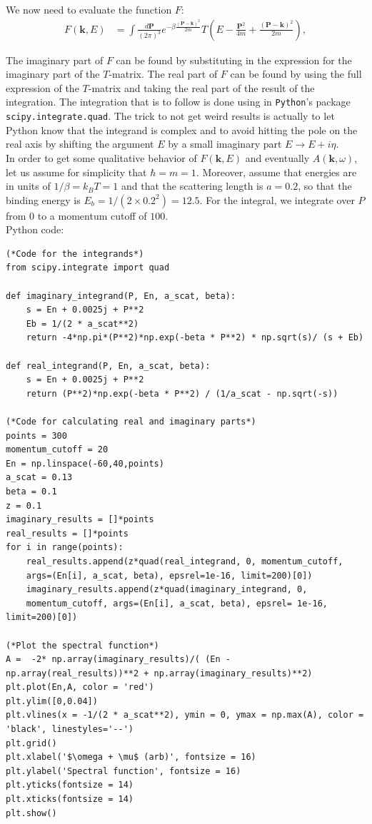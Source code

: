 \documentclass{article}
\theoremstyle{definition}
\begin{document}
\noindent We now need to evaluate the function $F$:
\begin{align}
F(\mathbf{k}, E) 
&= \int \frac{d\mathbf{P}}{(2\pi)^3} e^{-\beta \frac{(\mathbf{P} - \mathbf{k})^2}{2m}} 
T\left( E - \frac{\mathbf{P}^2}{4m} + \frac{(\mathbf{P} - \mathbf{k})^2}{2m} \right),
\end{align}

\noindent The imaginary part of $F$ can be found by substituting in the expression for the imaginary part of the $T$-matrix. The real part of $F$ can be found by using the full expression of the $T$-matrix and taking the real part of the result of the integration. The integration that is to follow is done using in \texttt{Python}'s package \texttt{scipy.integrate.quad}. The trick to not get weird results is actually to let Python know that the integrand is complex and to avoid hitting the pole on the real axis by shifting the argument $E$ by a small imaginary part $E \to E + i\eta$. \\

\noindent In order to get some qualitative behavior of $F(\mathbf{k}, E)$ and eventually $A(\mathbf{k}, \omega)$, let us assume for simplicity that $\hbar = m = 1$. Moreover, assume that energies are in units of $1/\beta = k_B T = 1$ and that the scattering length is $a = 0.2$, so that the binding energy is $E_b = 1/(2 \times 0.2^2) = 12.5$. For the integral, we integrate over $P$ from 0 to a momentum cutoff of $100$.  \\

\noindent Python code: 
\begin{lstlisting}
(*Code for the integrands*)
from scipy.integrate import quad

def imaginary_integrand(P, En, a_scat, beta):
    s = En + 0.0025j + P**2
    Eb = 1/(2 * a_scat**2)
    return -4*np.pi*(P**2)*np.exp(-beta * P**2) * np.sqrt(s)/ (s + Eb)

def real_integrand(P, En, a_scat, beta):
    s = En + 0.0025j + P**2
    return (P**2)*np.exp(-beta * P**2) / (1/a_scat - np.sqrt(-s))
        
(*Code for calculating real and imaginary parts*)
points = 300
momentum_cutoff = 20
En = np.linspace(-60,40,points)
a_scat = 0.13
beta = 0.1
z = 0.1
imaginary_results = []*points
real_results = []*points
for i in range(points):
    real_results.append(z*quad(real_integrand, 0, momentum_cutoff, 
    args=(En[i], a_scat, beta), epsrel=1e-16, limit=200)[0])
    imaginary_results.append(z*quad(imaginary_integrand, 0, 
    momentum_cutoff, args=(En[i], a_scat, beta), epsrel= 1e-16, limit=200)[0])
        
(*Plot the spectral function*)
A =  -2* np.array(imaginary_results)/( (En - np.array(real_results))**2 + np.array(imaginary_results)**2)
plt.plot(En,A, color = 'red')
plt.ylim([0,0.04])
plt.vlines(x = -1/(2 * a_scat**2), ymin = 0, ymax = np.max(A), color = 'black', linestyles='--')
plt.grid()
plt.xlabel('$\omega + \mu$ (arb)', fontsize = 16)
plt.ylabel('Spectral function', fontsize = 16)
plt.yticks(fontsize = 14)
plt.xticks(fontsize = 14)
plt.show()
\end{lstlisting}
\end{document}
